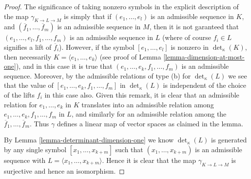 \begin{proof}
The significance of taking nonzero symbols in the explicit description
of the map $\gamma_{K \to L \to M}$ is simply that if $(e_1, \ldots, e_l)$
is an admissible sequence in $K$, and
$(\overline{f}_1, \ldots, \overline{f}_m)$ is an admissible sequence in
$M$, then it is not garanteed that $(e_1, \ldots, e_l, f_1, \ldots, f_m)$
is an admissible sequence in $L$ (where of course $f_i \in L$ signifies
a lift of $\overline{f}_i$). However, if the symbol
$[e_1, \ldots, e_l]$ is nonzero in $\det_\kappa(K)$, then
necessarily $K = \langle e_1, \ldots, e_k\rangle$ (see
proof of Lemma \ref{lemma-dimension-at-most-one}), and
in this case it is true that $(e_1, \ldots, e_k, f_1, \ldots, f_m)$
is an admissible sequence.
Moreover, by the admissible relations of type (b) for $\det_\kappa(L)$
we see that the value of $[e_1, \ldots, e_k, f_1, \ldots, f_m]$ in
$\det_\kappa(L)$ is independent of the choice of the lifts
$f_i$ in this case also. Given this remark, it is clear
that an admissible relation for $e_1, \ldots, e_k$ in $K$
translates into an admissible relation among
$e_1, \ldots, e_k, f_1, \ldots, f_m$ in $L$, and
similarly for an admissible relation among the
$\overline{f}_1, \ldots, \overline{f}_m$.
Thus $\gamma$ defines a linear map of vector spaces as claimed in the lemma.

\medskip\noindent
By Lemma \ref{lemma-determinant-dimension-one} we know
$\det_\kappa(L)$ is generated by any single
symbol $[x_1, \ldots, x_{k + m}]$ such that
$(x_1, \ldots, x_{k + m})$ is an admissible sequence
with $L = \langle x_1, \ldots, x_{k + m}\rangle$. Hence it is
clear that the map $\gamma_{K \to L \to M}$ is surjective and
hence an isomorphism.


\end{proof}
